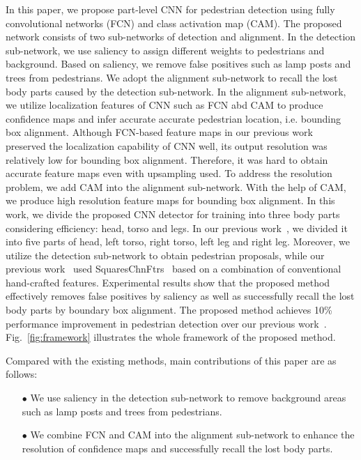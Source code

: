 \documentclass[journal]{IEEEtran}
\begin{document}
In this paper, we propose part-level CNN for pedestrian detection using fully convolutional networks (FCN) and class activation map (CAM). The proposed network consists of two sub-networks of detection and alignment. In the detection sub-network, we use saliency to assign different weights to pedestrians and background. Based on saliency, we remove false positives such as lamp posts and trees from pedestrians. We adopt the alignment sub-network to recall the lost body parts caused by the detection sub-network. In the alignment sub-network, we utilize localization features of CNN such as FCN abd CAM to produce confidence maps and infer accurate accurate pedestrian location, i.e. bounding box alignment. Although FCN-based feature maps in our previous work~\cite{wang2017part} preserved the localization capability of CNN well, its output resolution was relatively low for bounding box alignment. Therefore, it was hard to obtain accurate feature maps even with upsampling used. To address the resolution problem, we add CAM into the alignment sub-network. With the help of CAM, we produce high resolution feature maps for bounding box alignment. In this work, we divide the proposed CNN detector for training into three body parts considering efficiency: head, torso and legs. In our previous work~\cite{wang2017part}, we divided it into five parts of head, left torso, right torso, left leg and right leg. Moreover, we utilize the detection sub-network to obtain pedestrian proposals, while our previous work~\cite{wang2017part} used SquaresChnFtrs~\cite{benenson2013seeking} based on a combination of conventional hand-crafted features. Experimental results show that the proposed method effectively removes false positives by saliency as well as successfully recall the lost body parts by boundary box alignment. The proposed method achieves 10\% performance improvement in pedestrian detection over our previous work~\cite{wang2017part}. Fig.~\ref{fig:framework} illustrates the whole framework of the proposed method. 

Compared with the existing methods, main contributions of this paper are as follows:

\begin{itemize}
\item[$\bullet$] We use saliency in the detection sub-network to remove background areas such as lamp posts and trees from pedestrians.
\item[$\bullet$] We combine FCN and CAM into the alignment sub-network to enhance the resolution of confidence maps and successfully recall the lost body parts.
\end{itemize}
\end{document}
